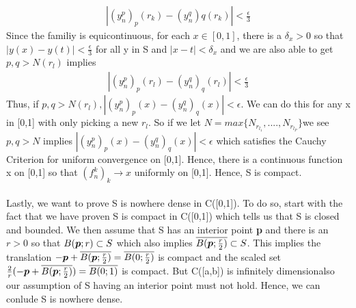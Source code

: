 \documentclass[11pt]{SelfArxOneColBMN}
\begin{document}
\begin{solution}
  \begin{eqnarray*}
    |(y_n^p)_p(r_k) - (y_n^q)q(r_k)| < \frac{\epsilon}{3}
  \end{eqnarray*}
  Since the familiy is equicontinuous, for each $x \in [0,1]$, there is a $\delta_x > 0$ so that $|y(x) - y(t)| < \frac{\epsilon}{3}$ for all y in S and $|x - t| < \delta_x$ and we are also able to get $p,q > N(r_l)$ implies
  \begin{eqnarray*}
    |(y_n^p)_p(r_l) - (y_n^q)_q(r_l)| < \frac{\epsilon}{3}
  \end{eqnarray*}
  Thus, if $p,q > N(r_l), |(y_n^p)_p(x) - (y_n^q)_q(x)| < \epsilon$. We can do this for any x in [0,1] with only picking a new $r_l$. So if we let $N = max\{N_{r_{l_1}},....,N_{r_{l_P}}\}$we see $p,q > N$ implies $|(y_n^p)_p(x) - (y_n^q)_q(x)| < \epsilon$ which satisfies the Cauchy Criterion for uniform convergence on [0,1]. Hence, there is a continuous function x on [0,1] so that $(f_n^k)_k \rightarrow x$ uniformly on [0,1]. Hence, S is compact.\\
  \\
  Lastly, we want to prove S is nowhere dense in C([0,1]). To do so, start with the fact that we have proven S is compact in C([0,1]) which tells us that S is closed and bounded. We then assume that S has an interior point \textbf{p} and there is an $r > 0$ so that $B(\boldsymbol{p};r) \subset S$ which also implies $\overline{B(\boldsymbol{p};\frac{r}{2})} \subset S$. This implies the translation $-\boldsymbol{p} + \overline{B(\boldsymbol{p};\frac{r}{2})} = \overline{B(0;\frac{r}{2})}$ is compact and the scaled set $\frac{2}{r}(-\boldsymbol{p} + \overline{B(\boldsymbol{p};\frac{r}{2})}) = \overline{B(0;1)}$ is compact. But C([a,b]) is infinitely dimensionalso our assumption of S having an interior point must not hold. Hence, we can conlude S is nowhere dense. 
\end{solution}
\end{document}
